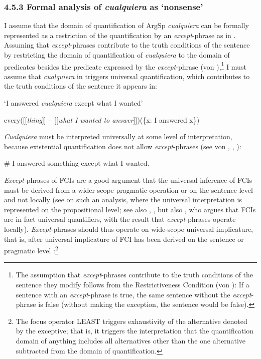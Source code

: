\documentclass[output=paper]{langscibook}
\begin{document}
\subsubsection{\textbf{4.5.3} \textbf{Formal} \textbf{analysis} \textbf{of} \textbf{\textit{cualquiera}} \textbf{as} \textbf{‘nonsense’}}

I assume that the domain of quantification of ArgSp \textit{cualquiera} can be formally represented as a restriction of the quantification by an \textit{except}{}-phrase as in . Assuming that \textit{except}{}-phrases contribute to the truth conditions of the sentence by restricting the domain of quantification of \textit{cualquiera} to the domain of predicates besides the predicate expressed by the \textit{except}{}-phrase (von \citealt{Fintel1994}),\footnote{ \textrm{The assumption that} \textrm{\textit{except}}\textrm{{}-phrases contribute to the truth conditions of the sentence they modify follows from the Restrictiveness Condition (von \citealt{Fintel1994}): If a sentence with an} \textrm{\textit{except}}\textrm{{}-phrase is true, the same sentence without the} \textrm{\textit{except}}\textrm{{}-phrase is false (without making the exception, the sentence would be false).}} I must assume that \textit{cualquiera} in  triggers universal quantification, which contributes to the truth conditions of the sentence it appears in:

\label{bkm:Ref63461516}    ‘I answered \textit{cualquiera} except what I wanted’

every([[\textit{thing}]] – [[\textit{what I wanted to answer}]])(\{x: I answered x\})

\textit{Cualquiera} must be interpreted universally at some level of interpretation, because existential quantification does not allow \textit{except}{}-phrases (see von \citealt{Fintel1994}, \citealt{Arregui2006}, \citealt{Gajewski2008}):

  \#  I answered something except what I wanted.

\textit{Except}{}-phrases of FCIs are a good argument that the universal inference of FCIs must be derived from a wider scope pragmatic operation or on the sentence level and not locally (see  on such an analysis, where the universal interpretation is represented on the propositional level; see also \citealt{Chierchia2006}, \citealt{Gajewski2008}, but also \citealt{Dayal1998,Dayal2004}, who argues that FCIs are in fact universal quantifiers, with the result that \textit{except}{}-phrases operate locally). \textit{Except}{}-phrases should thus operate on wide-scope universal implicature, that is, after universal implicature of FCI has been derived on the sentence or pragmatic level \citep{Gajewski2008}:\footnote{ \textrm{The focus operator LEAST triggers exhaustivity of the alternative denoted by the exceptive; that is, it triggers the interpretation that the quantification domain of anything includes all alternatives other than the one alternative subtracted from the domain of quantification.}}
\end{document}
